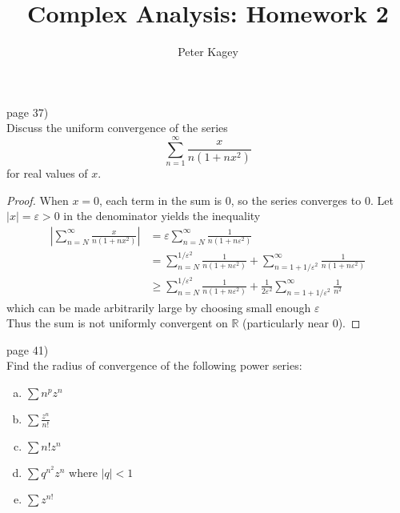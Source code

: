 \documentclass{article}
\newenvironment{problem}[2][Problem]{\begin{trivlist}
\item[\hskip \labelsep {\bfseries #1}\hskip \labelsep {\bfseries #2.}]}{\end{trivlist}}
\begin{document}
\title{Complex Analysis: Homework 2}
\author{Peter Kagey}

\maketitle

\begin{problem}{5} (page 37) \\
  Discuss the uniform convergence of the series \[
    \sum_{n = 1}^{\infty} \frac{x}{n(1 + nx^2)}
  \] for real values of $x$.
\end{problem}

\begin{proof}
  When $x = 0$, each term in the sum is $0$, so the series converges to $0$.
  Let $|x| = \varepsilon > 0$
  in the denominator yields the inequality \begin{align*}
    \left|\sum_{n = N}^\infty \frac{x}{n(1 + nx^2)}\right| &=
    \varepsilon\sum_{n = N}^\infty \frac{1}{n(1 + n\varepsilon^2)} \\
    &= \sum_{n = N}^{1/\varepsilon^2} \frac{1}{n(1 + n\varepsilon^2)} + \sum_{n = 1 + 1/\varepsilon^2}^{\infty} \frac{1}{n(1 + n\varepsilon^2)} \\
    &\geq \sum_{n = N}^{1/\varepsilon^2} \frac{1}{n(1 + n\varepsilon^2)} + \frac{1}{2\varepsilon^2}\sum_{n = 1 + 1/\varepsilon^2}^{\infty} \frac{1}{n^2}
  \end{align*} which can be made arbitrarily large by choosing small enough $\varepsilon$\\
%
  Thus the sum is not uniformly convergent on $\mathbb{R}$ (particularly near 0).
\end{proof}

\pagebreak

\begin{problem}{3} (page 41) \\
  Find the radius of convergence of the following power series: \begin{enumerate}[(a)]
    \item $\displaystyle\sum n^p z^n$
    \item $\displaystyle\sum \frac{z^n}{n!}$
    \item $\displaystyle\sum n!z^n$
    \item $\displaystyle\sum q^{n^2}z^n$ where $|q| < 1$
    \item $\displaystyle\sum z^{n!}$
  \end{enumerate}
\end{problem}
\end{document}
